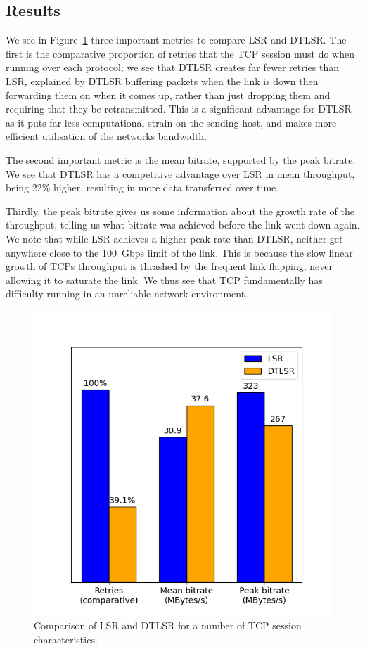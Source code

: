 \documentclass[withindex,glossary,openany]{cam-thesis}
\begin{document}
\subsection{Results}

We see in Figure~\ref{fig:tcp_bar} three important metrics to compare LSR and DTLSR. The first is the comparative proportion of retries that the TCP session must do when running over each protocol; we see that DTLSR creates far fewer retries than LSR, explained by DTLSR buffering packets when the link is down then forwarding them on when it comes up, rather than just dropping them and requiring that they be retransmitted. This is a significant advantage for DTLSR as it puts far less computational strain on the sending host, and makes more efficient utilisation of the networks bandwidth.

The second important metric is the mean bitrate, supported by the peak bitrate. We see that DTLSR has a competitive advantage over LSR in mean throughput, being 22\% higher, resulting in more data transferred over time.

Thirdly, the peak bitrate gives us some information about the growth rate of the throughput, telling us what bitrate was achieved before the link went down again. We note that while LSR achieves a higher peak rate than DTLSR, neither get anywhere close to the \SI{100}{Gbps} limit of the link. This is because the slow linear growth of TCPs throughput is thrashed by the frequent link flapping, never allowing it to saturate the link. We thus see that TCP fundamentally has difficulty running in an unreliable network environment.

\begin{figure}[htb]
  \centering
  \includegraphics[width=0.75\linewidth]{tcp_bar_flap2}
  \caption{Comparison of LSR and DTLSR for a number of TCP session characteristics.}
  \label{fig:tcp_bar}
\end{figure}
\end{document}
